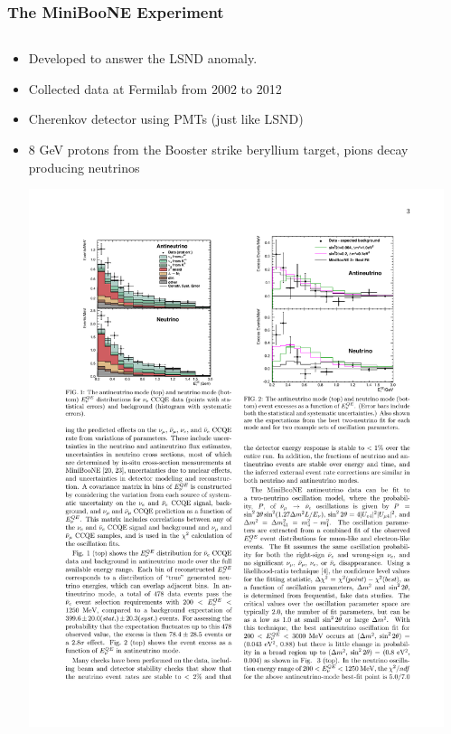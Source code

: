 \documentclass[mathserif,18pt,xcolor=table]{beamer}
\begin{document}
\begin{frame}
  \frametitle{The MiniBooNE Experiment}
  \scriptsize{
    \begin{columns}
      \begin{column}{.5\linewidth}      
        \begin{itemize}
        \item Developed to answer the LSND anomaly.
        \item Collected data at Fermilab from 2002 to 2012
        \item Cherenkov detector using PMTs (just like LSND)
        \item 8 GeV protons from the Booster strike beryllium target, pions decay producing neutrinos
        \begin{center}
          \includegraphics[width=.9\linewidth]{../figures/miniboone_excess.pdf}
        \end{center}
        \end{itemize}
      \end{column}
      \begin{column}{.5\linewidth}
        \begin{itemize}

\end{itemize}
\end{column}
\end{columns}}
\end{frame}
\end{document}
